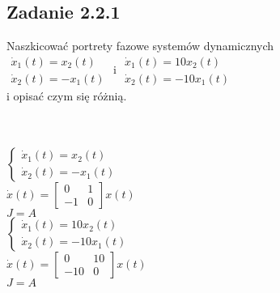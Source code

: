 \subsection*{Zadanie 2.2.1} {\color{darkgray}
	Naszkicować portrety fazowe systemów dynamicznych\\
	$\begin{array}{l}\dot{x}_1(t)=x_2(t)\\\dot{x}_2(t)=-x_1(t)\end{array}$ i $\begin{array}{l}\dot{x}_1(t)=10x_2(t)\\\dot{x}_2(t)=-10x_1(t)\end{array}$\\
	i opisać czym się różnią.\\
}\lineh
\\\\
\begin{multicols}{2}\noindent
$\begin{cases}\dot{x}_1(t)=x_2(t) \\ \dot{x}_2(t)=-x_1(t)\end{cases}$\\
$\dot{x}(t)=\left[\begin{array}{cc}0&1\\-1&0\end{array}\right]x(t)$\\
$J=A$
\\
$\begin{cases}\dot{x}_1(t)=10x_2(t) \\ \dot{x}_2(t)=-10x_1(t)\end{cases}$\\
$\dot{x}(t)=\left[\begin{array}{cc}0&10\\-10&0\end{array}\right]x(t)$\\
$J=A$\\
\end{multicols}

